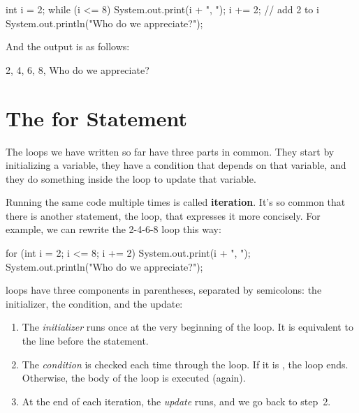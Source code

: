 \begin{code}
int i = 2;
while (i <= 8) {
    System.out.print(i + ", ");
    i += 2;  // add 2 to i
}
System.out.println("Who do we appreciate?");
\end{code}

And the output is as follows:

\begin{stdout}
2, 4, 6, 8, Who do we appreciate?
\end{stdout}


\section{The for Statement}


The loops we have written so far have three parts in common.
They start by initializing a variable, they have a condition that depends on that variable, and they do something inside the loop to update that variable.


Running the same code multiple times is called {\bf iteration}.
It's so common that there is another statement, the  loop, that expresses it more concisely.
For example, we can rewrite the 2-4-6-8 loop this way:

\begin{code}
for (int i = 2; i <= 8; i += 2) {
    System.out.print(i + ", ");
}
System.out.println("Who do we appreciate?");
\end{code}

 loops have three components in parentheses, separated by semicolons: the initializer, the condition, and the update:

\begin{enumerate}

\item The {\em initializer} runs once at the very beginning of the loop.
It is equivalent to the line before the  statement.

\item The {\em condition} is checked each time through the loop.
If it is , the loop ends.
Otherwise, the body of the loop is executed (again).

\item At the end of each iteration, the {\em update} runs, and we go back to step~2.

\end{enumerate}

